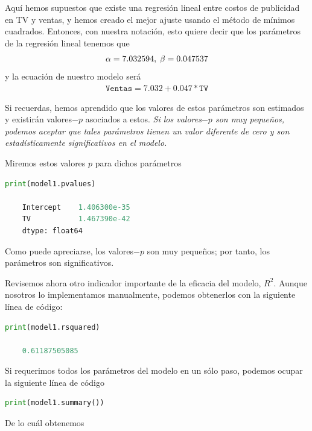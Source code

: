 Aquí hemos supuestos que existe una regresión lineal entre costos de publicidad en TV y ventas, y hemos creado el mejor ajuste usando el método de mínimos cuadrados. Entonces, con nuestra notación, esto quiere decir que los parámetros de la regresión lineal tenemos que
\begin{align}
	\alpha = 7.032594, \; \beta= 0.047537
\end{align}
y la ecuación de nuestro modelo será
\begin{align}
	\texttt{Ventas} = 7.032 + 0.047*\texttt{TV}
\end{align}


Si recuerdas, hemos aprendido que los valores de estos parámetros son estimados y existirán valores$-p$ asociados a estos. \emph{Si los valores$-p$ son muy pequeños, podemos aceptar que tales parámetros tienen un valor diferente de cero y son estadísticamente significativos en el modelo.}

Miremos estos valores $p$ para dichos parámetros
\begin{lstlisting}[language=Python]
	print(model1.pvalues)
	
	Intercept    1.406300e-35
	TV           1.467390e-42
	dtype: float64
\end{lstlisting}

Como puede apreciarse, los valores$-p$ son muy pequeños; por tanto, los parámetros son significativos.

Revisemos ahora otro indicador importante de la eficacia del modelo, $R^{2}.$ Aunque nosotros lo implementamos manualmente, podemos obtenerlos con la siguiente línea de código:
\begin{lstlisting}[language=Python]
	print(model1.rsquared)
	
	0.61187505085
\end{lstlisting}


Si requerimos todos los parámetros del modelo en un sólo paso, podemos ocupar la siguiente línea de código
\begin{lstlisting}[language=Python]
	print(model1.summary())
\end{lstlisting}
De lo cuál obtenemos

